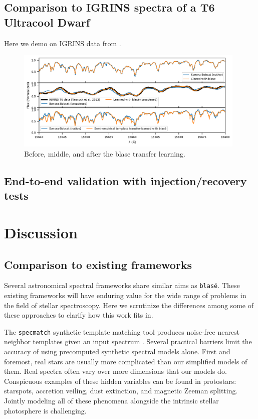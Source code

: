 \documentclass[twocolumn]{aastex631}
\begin{document}
\subsection{Comparison to IGRINS spectra of a T6 Ultracool Dwarf}

Here we demo on IGRINS data from \citet{2022MNRAS.tmp.1421T}.

\begin{figure}[hbt!]
    \centering
    \includegraphics[width=0.98\textwidth]{figures/IGRINS_T6_sonora_demo.png}
    \caption{Before, middle, and after the blase transfer learning.  }
    \label{fig_IGRINS_sonora_demo}
\end{figure}


\subsection{End-to-end validation with injection/recovery tests}\label{secInjRec}
\lipsum[2-3]

\section{Discussion}\label{secDiscuss}

\subsection{Comparison to existing frameworks}

Several astronomical spectral frameworks share similar aims as \texttt{blas\'e}.  These existing frameworks will have enduring value for the wide range of problems in the field of stellar spectroscopy.  Here we scrutinize the differences among some of these approaches to clarify how this work fits in.

The \texttt{specmatch} synthetic template matching tool produces noise-free nearest neighbor templates given an input spectrum \citep{2015PhDT........82P}.  Several practical barriers limit the accuracy of using precomputed synthetic spectral models alone. First and foremost, real stars are usually more complicated than our simplified models of them. Real spectra often vary over more dimensions that our models do.  Conspicuous examples of these hidden variables can be found in protostars: starspots, accretion veiling, dust extinction, and magnetic Zeeman splitting. Jointly modeling all of these phenomena alongside the intrinsic stellar photosphere is challenging.
\end{document}

